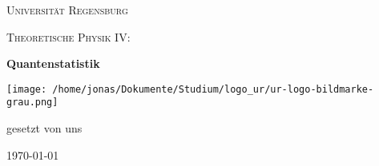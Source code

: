 \begin{titlepage}
	\centering
	{\scshape \LARGE Universität Regensburg \par}
	\vspace{1cm}
	{\scshape\Large Theoretische Physik IV: \par}
	\vspace{1.5cm}
	{\huge\bfseries Quantenstatistik \par}
	\vspace{2cm}
	\texttt{[image: /home/jonas/Dokumente/Studium/logo\_ur/ur-logo-bildmarke-grau.png]}\par
	\vfill
	{\large gesetzt von uns\par}

	\vfill

	{\large \today\par}
\end{titlepage}
